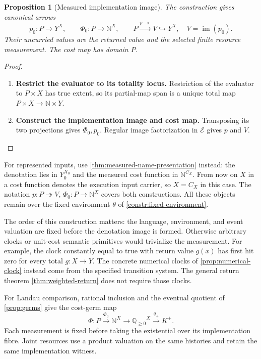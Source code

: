 \documentclass[11pt,a4paper]{article}
\numberwithin{algorithm}{section}
\numberwithin{equation}{section}
\newtheorem{proposition}[proposition]{Proposition}
\theoremstyle{definition}
\theoremstyle{remark}
\theoremstyle{plain}
\newcommand{\E}{\mathcal E}
\newcommand{\N}{\mathbb N}
\newcommand{\QQ}{\mathbb Q}
\newcommand{\incl}{\hookrightarrow}
\newcommand{\onto}{\twoheadrightarrow}
\newcommand{\Qplus}{{\QQ_{\ge0}}}
\newcommand{\im}{\operatorname{im}}
\theoremstyle{definition}
\theoremstyle{plain}
\begin{document}
\begin{proposition}[Measured implementation image]

\label{prop:measured-image}
The construction gives canonical arrows
\[
 p_0:P\to Y^X,\qquad\Phi_0:P\to\N^X,
 \qquad P\xrightarrow{p\,\onto}V\incl Y^X,
 \quad V=\im(p_0).
\]
Their uncurried values are the returned value and the selected finite
resource measurement. The cost map has domain $P$.
\end{proposition}
\begin{proof}\leavevmode
\begin{enumerate}[leftmargin=*,align=left]
\item \textbf{Restrict the evaluator to its totality locus.}
Restriction of the evaluator to $P\times X$ has true extent, so its
partial-map span is a unique total map $P\times X\to\N\times Y$.

\item \textbf{Construct the implementation image and cost map.}
Transposing its two projections gives $\Phi_0,p_0$. Regular image
factorization in $\E$ gives $p$ and $V$.
\end{enumerate}
\end{proof}

For represented inputs, use \cref{thm:measured-name-presentation}
instead: the denotation lies in $Y_0^{X_0}$ and the measured cost function in
$\N^{C_X}$. From now on $X$ in a cost function denotes the execution input carrier, so $X=C_X$ in this case. The notation $p:P\onto V$, $\Phi_0:P\to\N^X$ covers both constructions. All these objects remain over the fixed
environment $\theta$ of \cref{constr:fixed-environment}.

The order of this construction matters: the language, environment,
and event valuation are fixed before the denotation image is formed.
Otherwise arbitrary clocks or unit-cost semantic primitives would
trivialize the measurement. For example, the clock constantly equal
to true with return value $g(x)$ has first hit zero for every total
$g:X\to Y$. The concrete numerical clocks of
\cref{prop:numerical-clock} instead come from the specified transition
system. The general return theorem \cref{thm:weighted-return} does
not require those clocks.

For Landau comparison, rational inclusion and the eventual quotient of \cref{prop:germs}
give the cost-germ map
\[
 \Phi:P\xrightarrow{\Phi_0}\N^X\longrightarrow\Qplus^X
      \xrightarrow{q_+}K^+.
\]
Each measurement is fixed before taking the existential over its
implementation fibre. Joint resources use a product valuation on the
same histories and retain the same implementation witness.
\end{document}
